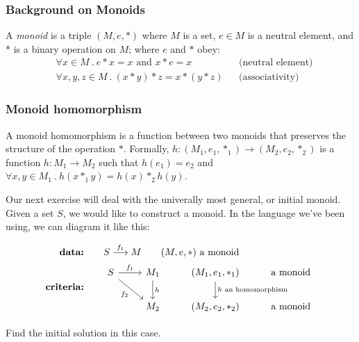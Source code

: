 \subsubsection*{Background on Monoids}

A \emph{monoid} is a triple $(M, e, \ast)$ where $M$ is a set, $e \in M$ is a
neutral element, and $\ast$ is a binary operation on $M$; where $e$ and $\ast$
obey:
\begin{align*}
    & \forall x \in M\ .\ 
    e \ast x = x \text{ and } x \ast e = x && \text{(neutral
    element)} \\
    & \forall x,y,z \in M\ .\ 
    (x \ast y) \ast z = x \ast (y \ast z) && \text{(associativity)}
\end{align*}

\subsubsection*{Monoid homomorphism}

A monoid homomorphism is a function between two monoids that preserves the
structure of the operation $\ast$. Formally,
$h : (M_1, e_1, \ast_1) \rightarrow (M_2, e_2, \ast_2)$ is a function
$h: M_1\to M_2$ such that $h(e_1) = e_2$ and
$\forall x, y \in M_1\ .\ h(x \ast_1 y) = h(x) \ast_2 h(y)$.

Our next exercise will deal with the univerally most general, or initial monoid.
Given a set $S$, we would like to construct  a monoid. In the language we've
been using, we can diagram it like this:

\begin{align*}
    \textbf{data:}\qquad& S \overset{f_1}{\longrightarrow}M
    \qquad \text{$(M,e,\ast)$ a monoid}\\
    \textbf{criteria:}\qquad& \begin{tikzcd}[ampersand replacement=\&]
        S \arrow[r, "f_1"] \arrow[dr, swap, "f_2"] \& 
        M_1 
        \arrow[d, "h"] 
        \& (M_1,e_1,\ast_1) 
        \arrow[d, "\text{$h$ an homomorphism}"] 
        \& \text{a monoid}
        \\
        {}  
        \& M_2 \& (M_2,e_2,\ast_2) \& \text{a monoid}
    \end{tikzcd}
\end{align*}

\begin{exercise}
    Find the initial solution in this case.
\end{exercise}


